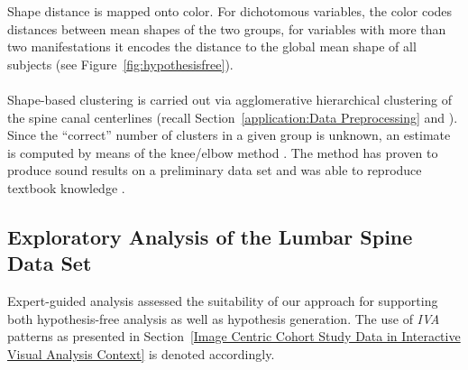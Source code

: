 \documentclass[journal]{style/vgtc} 			          %
\begin{document}
Shape distance is mapped onto color.
%
For dichotomous variables, the color codes distances between mean shapes of the two groups, for variables with more than two manifestations it encodes the distance to the global mean shape of all subjects (see Figure~\ref{fig:hypothesisfree}).
\\\\
Shape-based clustering is carried out via agglomerative hierarchical clustering of the spine canal centerlines (recall Section~\ref{application:Data Preprocessing} and \cite{Klemm2013VMV}).
%
Since the ``correct'' number of clusters in a given group is unknown, an estimate is computed by means of the knee/elbow method \cite{Salvador2004}.
%
%
The method has proven to produce sound results on a preliminary data set and was able to reproduce textbook knowledge \cite{Klemm2013VMV}.

\subsection{Exploratory Analysis of the Lumbar Spine Data Set}
%
Expert-guided analysis assessed the suitability of our approach for supporting both hypothesis-free analysis as well as hypothesis generation. 
%
The use of \emph{IVA} patterns as presented in Section~\ref{Image Centric Cohort Study Data in Interactive Visual Analysis Context} is denoted accordingly.
%
\end{document}
